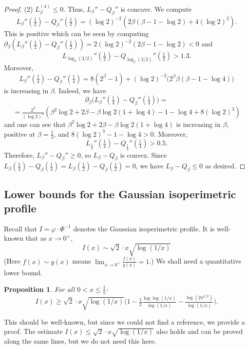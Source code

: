 \documentclass[12pt]{amsart}
\theoremstyle{plain}
\newtheorem{prop}[thm]{Proposition}
\theoremstyle{definition}
\theoremstyle{remark}
\numberwithin{equation}{section}
\begin{document}
\begin{proof}
 (2) 
 $L_\beta^{(4)}\leq 0$. Thus, $L_\beta''-Q_\beta''$ is concave. We compute
 \[L_\beta''(\tfrac{1}{2})-Q_\beta''(\tfrac{1}{2})=(\log 2)^{-2}(2 \beta (\beta-   1-\log 2)+4 (\log 2)^2).\]
 This is positive which can be seen  by computing $\partial_\beta(L_\beta''(\tfrac{1}{2})-Q_\beta''(\tfrac{1}{2}))=2(\log 2)^{-2}(2\beta-1-\log 2)<0$ 
 and 
 \[L_{\log_2(3/2)}''(\tfrac{1}{2})-Q_{\log_2(3/2)}''(\tfrac{1}{2})>1.3.\]
Moreover, 
 \[
  L_\beta''(\tfrac{1}{4})-Q_\beta''(\tfrac{1}{4})
  = 8 \left(2^{\beta }-1\right)+(\log 2)^{-2}\bigl(2^{\beta } \beta  (\beta -1-\log 4)\bigr)
 \]
 is increasing in $\beta$. Indeed, we have 
 \[
  \partial_\beta\bigl(L_\beta''(\tfrac{1}{4})-Q_\beta''(\tfrac{1}{4})\bigr) =
 \]
 \[
  = \tfrac{2^{\beta }}{(\log 2)^2} \left(\beta ^2 \log 2+2 \beta -\beta  \log 2 (1+\log 4)-1-\log 4+8 (\log 2)^3\right)
 \]
 and one can see that $\beta ^2 \log 2+2 \beta -\beta  \log 2 (1+\log 4)$ is increasing in $\beta$,  positive at $\beta=\tfrac{1}{2}$, and  $8 (\log 2)^3-1-\log 4>0$. 
Moreover, 
 \begin{equation*}
    L_{\frac{1}{2}}''(\tfrac{1}{4})-Q_{\frac{1}{2}}''(\tfrac{1}{4})>0.5.
\end{equation*}
Therefore,
  $L_\beta''-Q_\beta''\geq 0$, so $L_\beta-Q_\beta$ is convex. Since $L_\beta(\tfrac{1}{4})-Q_\beta(\tfrac{1}{4}) = L_\beta(\tfrac{1}{2})-Q_\beta(\tfrac{1}{2})=0$, we have $L_\beta-Q_\beta\leq 0$ as desired.
\end{proof}


\subsection{Lower bounds for the Gaussian isoperimetric profile}
Recall that $I=\varphi\cdot \Phi^{-1}$ denotes the Gaussian isoperimetric profile.
It is well-known that as $x\to 0^+$,
\[ I(x) \sim \sqrt{2}\cdot x \sqrt{\log(1/x)} \]
(Here $f(x)\sim g(x)$ means $\lim_{x\to 0^+} \frac{f(x)}{g(x)}=1$.)
We shall need a quantitative lower bound.

\begin{prop}\label{prop:Ilowerbd}
For all $0<x\le \frac15$:
\[I(x)\ge \sqrt{2}\cdot x\sqrt{\log(1/x)}\Big(1- \tfrac12 \tfrac{\log\log(1/x)}{\log(1/x)}-\tfrac{\log(2\pi^{1/2})}{\log(1/x)}\Big).\]
\end{prop}

This should be well-known, but since we could not find a reference, we provide a proof.
The estimate $I(x)\le \sqrt{2}\cdot x\sqrt{\log(1/x)}$ also holds and can be proved along the same lines, but we do not need this here.
\end{document}
